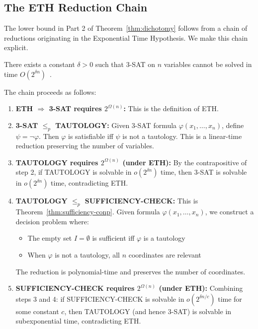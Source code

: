 \subsection{The ETH Reduction Chain}\label{sec:eth-chain}

The lower bound in Part 2 of Theorem~\ref{thm:dichotomy} follows from a chain of reductions originating in the Exponential Time Hypothesis. We make this chain explicit.

\begin{definition}
There exists a constant $\delta > 0$ such that 3-SAT on $n$ variables cannot be solved in time $O(2^{\delta n})$~\cite{impagliazzo2001complexity}.
\end{definition}

The chain proceeds as follows:

\begin{enumerate}
\item \textbf{ETH $\Rightarrow$ 3-SAT requires $2^{\Omega(n)}$:} This is the definition of ETH.

\item \textbf{3-SAT $\leq_p$ TAUTOLOGY:} Given 3-SAT formula $\varphi(x_1, \ldots, x_n)$, define $\psi = \neg\varphi$. Then $\varphi$ is satisfiable iff $\psi$ is not a tautology. This is a linear-time reduction preserving the number of variables.

\item \textbf{TAUTOLOGY requires $2^{\Omega(n)}$ (under ETH):} By the contrapositive of step 2, if TAUTOLOGY is solvable in $o(2^{\delta n})$ time, then 3-SAT is solvable in $o(2^{\delta n})$ time, contradicting ETH.

\item \textbf{TAUTOLOGY $\leq_p$ SUFFICIENCY-CHECK:} This is Theorem~\ref{thm:sufficiency-conp}. Given formula $\varphi(x_1, \ldots, x_n)$, we construct a decision problem where:
\begin{itemize}
\item The empty set $I = \emptyset$ is sufficient iff $\varphi$ is a tautology
\item When $\varphi$ is not a tautology, all $n$ coordinates are relevant
\end{itemize}
The reduction is polynomial-time and preserves the number of coordinates.

\item \textbf{SUFFICIENCY-CHECK requires $2^{\Omega(n)}$ (under ETH):} Combining steps 3 and 4: if SUFFICIENCY-CHECK is solvable in $o(2^{\delta n/c})$ time for some constant $c$, then TAUTOLOGY (and hence 3-SAT) is solvable in subexponential time, contradicting ETH.
\end{enumerate}

